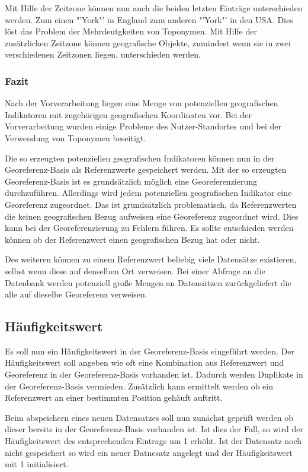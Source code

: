 				Mit Hilfe der Zeitzone können nun auch die beiden letzten Einträge unterschieden werden. 
				Zum einen "'York"' in England zum anderen "'York"' in den USA. 
				Dies löst das Problem der Mehrdeutgkeiten von Toponymen. 
				Mit Hilfe der zusätzlichen Zeitzone können geografische Objekte, zumindest wenn sie in zwei verschiedenen Zeitzonen liegen, unterschieden werden.

			\subsubsection{Fazit} 

				Nach der Vorverarbeitung liegen eine Menge von potenziellen geografischen Indikatoren mit zugehörigen geografischen Koordinaten vor.
				Bei der Vorverarbeitung wurden einige Probleme des Nutzer-Standortes und bei der Verwendung von Toponymen beseitigt.

				Die so erzeugten potenziellen geografischen Indikatoren können nun in der Georeferenz-Basis als Referenzwerte gespeichert werden.
				Mit der so erzeugten Georeferenz-Basis ist es grundsätzlich möglich eine Georeferenzierung durchzuführen. 
				Allerdings wird jedem potenziellen geografischen Indikator eine Georeferenz zugeordnet.
				Das ist grundsätzlich problematisch, da Referenzwerten die keinen geografischen Bezug aufweisen eine Georeferenz zugeordnet wird. 
				Dies kann bei der Georeferenzierung zu Fehlern führen.
				Es sollte entschieden werden können ob der Referenzwert einen geografischen Bezug hat oder nicht. 

				Des weiteren können zu einem Referenzwert beliebig viele Datensätze existieren, selbst wenn diese auf denselben Ort verweisen. 
				Bei einer Abfrage an die Datenbank werden potenziell große Mengen an Datensätzen zurückgeliefert die alle auf dieselbe Georeferenz verweisen.

		\subsection{Häufigkeitswert}

			Es soll nun ein Häufigkeitswert in der Georeferenz-Basis eingeführt werden.
			Der Häufigkeitswert soll angeben wie oft eine Kombination aus Referenzwert und Georeferenz in der Georeferenz-Basis vorhanden ist.
			Dadurch werden Duplikate in der Georeferenz-Basis vermieden.
			Zusätzlich kann ermittelt werden ob ein Referenzwert an einer bestimmten Position gehäuft auftritt.

			Beim abspeichern eines neuen Datensatzes soll nun zunächst geprüft werden ob dieser bereits in der Georeferenz-Basis vorhanden ist. 
			Ist dies der Fall, so wird der Häufigkeitswert des entsprechenden Eintrags um 1 erhöht.
			Ist der Datensatz noch nicht gespeichert so wird ein neuer Datnesatz angelegt und der Häufigkeitswert mit 1 initialisiert.

